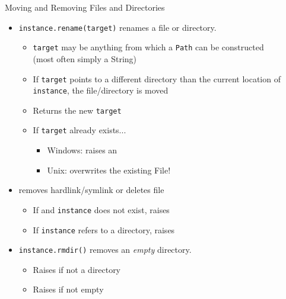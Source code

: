 \begin{frame}{Moving and Removing Files and Directories}
%
\begin{itemize}
\item \texttt{instance.rename(target)} renames a file or directory.
	\begin{itemize}
	\item \texttt{target} may be anything from which a \texttt{Path} can be constructed \\
		(most often simply a String)
	\item If \texttt{target} points to a different directory than the current location of \texttt{instance}, the file/directory is moved
	\item Returns the new \texttt{target}
	\item If \texttt{target} already exists...
		\begin{itemize}
		\item Windows: raises an 
		\item Unix: overwrites the existing File!
		\end{itemize}
	\end{itemize}
\item {} removes hardlink/symlink or deletes file
	\begin{itemize}
	\item If  and \texttt{instance} does not exist, raises 
	\item If \texttt{instance} refers to a directory, raises 
	\end{itemize}
\item \texttt{instance.rmdir()} removes an \emph{empty} directory.
	\begin{itemize}
	\item Raises  if not a directory
	\item Raises  if not empty
	\end{itemize}
\end{itemize}
%
\end{frame}



